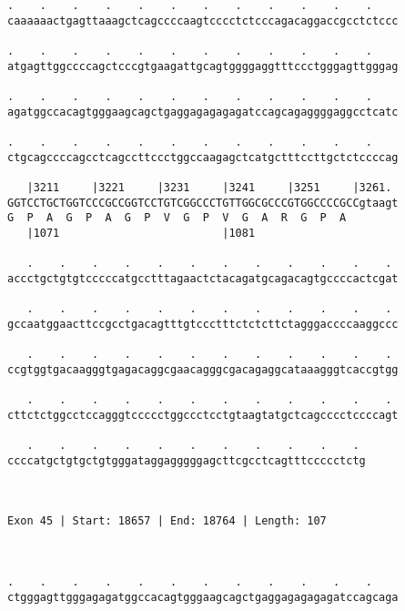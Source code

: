 \documentclass{article}
\begin{document}
\begin{Verbatim}
.    .    .    .    .    .    .    .    .    .    .    .    
caaaaaactgagttaaagctcagccccaagtcccctctcccagacaggaccgcctctccc
                                                            
.    .    .    .    .    .    .    .    .    .    .    .    
atgagttggccccagctcccgtgaagattgcagtggggaggtttccctgggagttgggag
                                                            
.    .    .    .    .    .    .    .    .    .    .    .    
agatggccacagtgggaagcagctgaggagagagagatccagcagaggggaggcctcatc
                                                            
.    .    .    .    .    .    .    .    .    .    .    .    
ctgcagccccagcctcagccttccctggccaagagctcatgctttccttgctctccccag
                                                            
   |3211     |3221     |3231     |3241     |3251     |3261. 
GGTCCTGCTGGTCCCGCCGGTCCTGTCGGCCCTGTTGGCGCCCGTGGCCCCGCCgtaagt
G  P  A  G  P  A  G  P  V  G  P  V  G  A  R  G  P  A        
   |1071                         |1081                      
  
   .    .    .    .    .    .    .    .    .    .    .    . 
accctgctgtgtcccccatgcctttagaactctacagatgcagacagtgccccactcgat
                                                            
   .    .    .    .    .    .    .    .    .    .    .    . 
gccaatggaacttccgcctgacagtttgtccctttctctcttctagggaccccaaggccc
                                                            
   .    .    .    .    .    .    .    .    .    .    .    . 
ccgtggtgacaagggtgagacaggcgaacagggcgacagaggcataaagggtcaccgtgg
                                                            
   .    .    .    .    .    .    .    .    .    .    .    . 
cttctctggcctccagggtccccctggccctcctgtaagtatgctcagcccctccccagt
                                                            
   .    .    .    .    .    .    .    .    .    .    . 
ccccatgctgtgctgtgggataggagggggagcttcgcctcagtttccccctctg
                                                       
                                                       
 
Exon 45 | Start: 18657 | End: 18764 | Length: 107



.    .    .    .    .    .    .    .    .    .    .    .    
ctgggagttgggagagatggccacagtgggaagcagctgaggagagagagatccagcaga
                                                            

\end{Verbatim}
\end{document}
